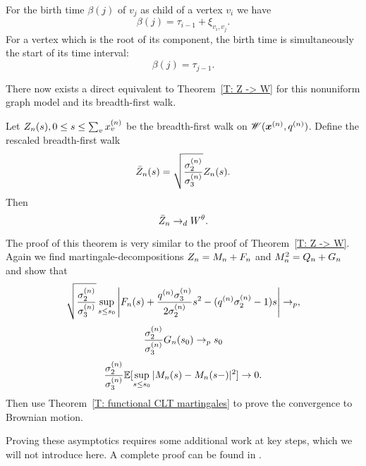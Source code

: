 For the birth time $\beta(j)$ of $v_j$ as child of a vertex $v_i$ we have
\begin{equation}
	\beta(j) = \tau_{i-1} + \xi_{v_i, v_j}.
\end{equation}
For a vertex which is the root of its component, the birth time is simultaneously the start of its time interval:
\begin{equation}
	\beta(j) = \tau_{j-1}.
\end{equation}


There now exists a direct equivalent to Theorem~\ref{T: Z -> W} for this nonuniform graph model and its breadth-first walk.

\begin{theorem} \label{T: Z -> W nonu}
	Let $Z_n(s), 0 \leq s \leq \sum_{v} x^{(n)}_v$ be the breadth-first walk on $\mathscr{W}(\boldsymbol{x}^{(n)}, q^{(n)})$.
	Define the rescaled breadth-first walk
	\begin{equation}
		\bar{Z}_n(s) = \sqrt{\frac{\sigma^{(n)}_2}{\sigma^{(n)}_3}} Z_n(s).
	\end{equation}
	Then
	\begin{equation}
		\bar{Z}_n \rightarrow_d W^{\theta}.
	\end{equation}	
\end{theorem}

The proof of this theorem is very similar to the proof of Theorem~\ref{T: Z -> W}.
Again we find martingale-decompositions $Z_n = M_n + F_n$ and $M_n^2 = Q_n + G_n$
and show that
\begin{equation}
	\sqrt{\frac{\sigma^{(n)}_2}{\sigma^{(n)}_3}} \sup_{s \leq s_0} \left| F_n(s) + \frac{q^{(n)}\sigma^{(n)}_3}{2\sigma^{(n)}_2}s^2 - (q^{(n)}\sigma^{(n)}_2 - 1)s \right| \rightarrow_p,
\end{equation}
\begin{equation}
\frac{\sigma^{(n)}_2}{\sigma^{(n)}_3} G_n(s_0) \rightarrow_p s_0
\end{equation}
\begin{equation}
\frac{\sigma^{(n)}_2}{\sigma^{(n)}_3} \mathbb{E}[  \sup_{s \leq s_0} | M_n(s) - M_n(s-) |^2] \rightarrow 0.
\end{equation}
Then use Theorem~\ref{T: functional CLT martingales} to prove the convergence to Brownian motion.

Proving these asymptotics requires some additional work at key steps,
which we will not introduce here.
A complete proof can be found in \cite[p.828ff.]{Aldous.1997}.

